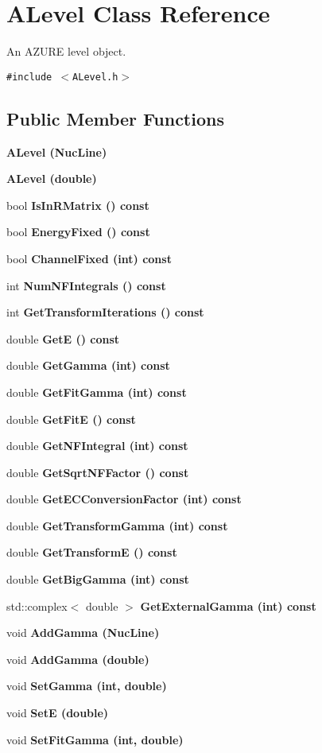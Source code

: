 \section{ALevel Class Reference}
\label{classALevel}
An AZURE level object.  


{\tt \#include $<$ALevel.h$>$}

\subsection*{Public Member Functions}
\begin{CompactItemize}
\item 
\bf{ALevel} (Nuc\-Line)
\item 
\bf{ALevel} (double)
\item 
bool \bf{Is\-In\-RMatrix} () const 
\item 
bool \bf{Energy\-Fixed} () const 
\item 
bool \bf{Channel\-Fixed} (int) const 
\item 
int \bf{Num\-NFIntegrals} () const 
\item 
int \bf{Get\-Transform\-Iterations} () const 
\item 
double \bf{Get\-E} () const 
\item 
double \bf{Get\-Gamma} (int) const 
\item 
double \bf{Get\-Fit\-Gamma} (int) const 
\item 
double \bf{Get\-Fit\-E} () const 
\item 
double \bf{Get\-NFIntegral} (int) const 
\item 
double \bf{Get\-Sqrt\-NFFactor} () const 
\item 
double \bf{Get\-ECConversion\-Factor} (int) const 
\item 
double \bf{Get\-Transform\-Gamma} (int) const 
\item 
double \bf{Get\-Transform\-E} () const 
\item 
double \bf{Get\-Big\-Gamma} (int) const 
\item 
std::complex$<$ double $>$ \bf{Get\-External\-Gamma} (int) const 
\item 
void \bf{Add\-Gamma} (Nuc\-Line)
\item 
void \bf{Add\-Gamma} (double)
\item 
void \bf{Set\-Gamma} (int, double)
\item 
void \bf{Set\-E} (double)
\item 
void \bf{Set\-Fit\-Gamma} (int, double)
\item 

\end{CompactItemize}
